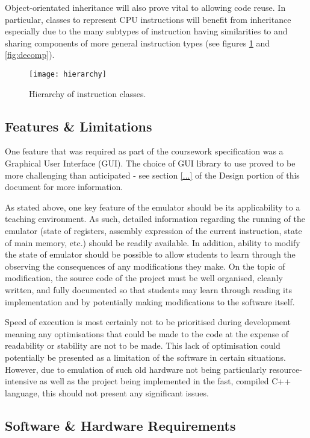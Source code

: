         Object-orientated inheritance will also prove vital to allowing code reuse. In particular, classes to represent CPU instructions will benefit from inheritance especially due to the many subtypes of instruction having similarities to and sharing components of more general instruction types (see figures \ref{fig:hierarchy} and \ref{fig:decomp}).

        \begin{figure}[h]
            \centering
            \texttt{[image: hierarchy]}
            \caption{Hierarchy of instruction classes.}
            \label{fig:hierarchy}
        \end{figure}

\subsection{Features \& Limitations}
    One feature that was required as part of the coursework specification was a Graphical User Interface (GUI). The choice of GUI library to use proved to be more challenging than anticipated - see section \ref{...} of the Design portion of this document for more information.

    As stated above, one key feature of the emulator should be its applicability to a teaching environment. As such, detailed information regarding the running of the emulator (state of registers, assembly expression of the current instruction, state of main memory, etc.) should be readily available. In addition, ability to modify the state of emulator should be possible to allow students to learn through the observing the consequences of any modifications they make. On the topic of modification, the source code of the project must be well organised, cleanly written, and fully documented so that students may learn through reading its implementation and by potentially making modifications to the software itself.

    Speed of execution is most certainly not to be prioritised during development meaning any optimisations that could be made to the code at the expense of readability or stability are not to be made. This lack of optimisation could potentially be presented as a limitation of the software in certain situations. However, due to emulation of such old hardware not being particularly resource-intensive as well as the project being implemented in the fast, compiled C++ language, this should not present any significant issues.

\subsection{Software \& Hardware Requirements}
